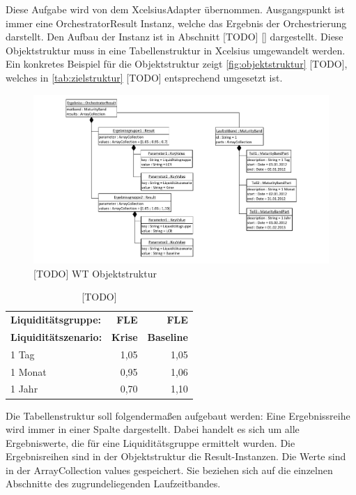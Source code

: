 Diese Aufgabe wird von dem XcelsiusAdapter übernommen. Ausgangspunkt ist immer eine OrchestratorResult Instanz, welche das Ergebnis der Orchestrierung darstellt. Den Aufbau der Instanz ist in Abschnitt [TODO] \vref{} dargestellt. Diese Objektstruktur muss in eine Tabellenstruktur in Xcelsius umgewandelt werden. Ein konkretes Beispiel für die Objektstruktur zeigt \vref{fig:objektstruktur} [TODO], welches in \vref{tab:zielstruktur} [TODO] entsprechend umgesetzt ist.

\begin{figure}[h]
\centering
\setlength{\unitlength}{1mm}
\includegraphics[width=15cm]{Visio/Entwurf-Objektstruktur.pdf}
\caption{[TODO] WT Objektstruktur\label{fig:objektstruktur}}
\end{figure}


\begin{table}[htbp]
  \centering
  \caption{[TODO]}
    \begin{tabular}{l|r|r}
    \toprule
    \textbf{Liquiditätsgruppe:} & \textbf{FLE} & \textbf{FLE} \\
    \textbf{Liquiditätszenario:} & \textbf{Krise} & \textbf{Baseline} \\
    \midrule
    1 Tag & 1,05  & 1,05 \\
    1 Monat & 0,95  & 1,06 \\
    1 Jahr & 0,70  & 1,10 \\
    \bottomrule
    \end{tabular}%
  \label{tab:zielstruktur}%
\end{table}%






Die Tabellenstruktur soll folgendermaßen aufgebaut werden: Eine Ergebnissreihe wird immer in einer Spalte dargestellt. Dabei handelt es sich um alle Ergebniswerte, die für eine Liquiditätsgruppe ermittelt wurden. Die Ergebnisreihen sind in der Objektstruktur die Result-Instanzen. Die Werte sind in der ArrayCollection values gespeichert. Sie beziehen sich auf die einzelnen Abschnitte des zugrundeliegenden Laufzeitbandes.

